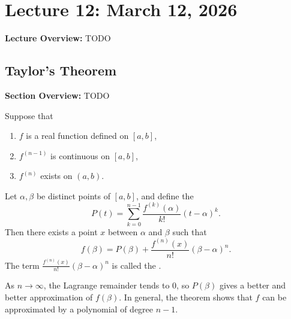 \documentclass[../master/master.tex]{subfiles}
\begin{document}
\renewcommand{\lecturenum}{12}
\renewcommand{\lecturedate}{March 12, 2026}
\renewcommand{\lecturetopic}{Taylor's Theorem}

\section{Lecture \lecturenum : \lecturedate}

\begin{lecturesummary}
\textbf{Lecture Overview:} TODO
\end{lecturesummary}

\subsection{Taylor's Theorem}

\begin{summarybox}
\textbf{Section Overview:} TODO
\end{summarybox}

\begin{theorem}
Suppose that
\begin{enumerate}
    \item $f$ is a real function defined on $[a,b]$,
    \item $f^{(n-1)}$ is continuous on $[a,b]$,
    \item $f^{(n)}$ exists on $(a,b)$.
\end{enumerate}
Let $\alpha, \beta$ be distinct points of $[a,b]$, and define the 
\[
P(t) = \sum_{k=0}^{n-1} \frac{f^{(k)}(\alpha)}{k!} (t - \alpha)^k.
\]
Then there exists a point $x$ between $\alpha$ and $\beta$ such that
\[
f(\beta) = P(\beta) + \frac{f^{(n)}(x)}{n!} (\beta - \alpha)^n.
\]
The term $\frac{f^{(n)}(x)}{n!}(\beta - \alpha)^n$ is called the .
\end{theorem}

\begin{remark}
As $n \to \infty$, the Lagrange remainder tends to $0$, so $P(\beta)$ gives a better and better approximation of $f(\beta)$. In general, the theorem shows that $f$ can be approximated by a polynomial of degree $n-1$.
\end{remark}
\end{document}
